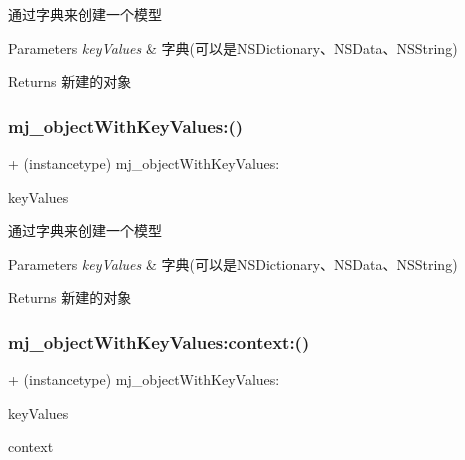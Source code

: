 通过字典来创建一个模型 
\begin{DoxyParams}{Parameters}
{\em key\+Values} & 字典(可以是\+N\+S\+Dictionary、\+N\+S\+Data、\+N\+S\+String) \\
\hline
\end{DoxyParams}
\begin{DoxyReturn}{Returns}
新建的对象 
\end{DoxyReturn}
\mbox{\label{category_n_s_object_07_m_j_key_value_08_a8620ab8d9fd3e832d4f8de504f49724d}} 
\subsubsection{\texorpdfstring{mj\+\_\+object\+With\+Key\+Values\+:()}{mj\_objectWithKeyValues:()}\hspace{0.1cm}{\footnotesize\ttfamily [3/3]}}
{\footnotesize\ttfamily + (instancetype) mj\+\_\+object\+With\+Key\+Values\+: \begin{DoxyParamCaption}\item[{(id)}]{key\+Values }\end{DoxyParamCaption}}

通过字典来创建一个模型 
\begin{DoxyParams}{Parameters}
{\em key\+Values} & 字典(可以是\+N\+S\+Dictionary、\+N\+S\+Data、\+N\+S\+String) \\
\hline
\end{DoxyParams}
\begin{DoxyReturn}{Returns}
新建的对象 
\end{DoxyReturn}
\mbox{\label{category_n_s_object_07_m_j_key_value_08_aac86cc29566e0ff89cadb66d79a61db8}} 
\subsubsection{\texorpdfstring{mj\+\_\+object\+With\+Key\+Values\+:context\+:()}{mj\_objectWithKeyValues:context:()}\hspace{0.1cm}{\footnotesize\ttfamily [1/3]}}
{\footnotesize\ttfamily + (instancetype) mj\+\_\+object\+With\+Key\+Values\+: \begin{DoxyParamCaption}\item[{(id)}]{key\+Values }\item[{context:(N\+S\+Managed\+Object\+Context $\ast$)}]{context }\end{DoxyParamCaption}}

